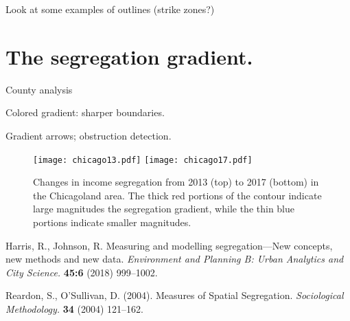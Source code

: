 \documentclass{article}
\theoremstyle{theorem}
\theoremstyle{definition}
\begin{document}
Look at some examples of outlines (strike zones?)

\section{The segregation gradient.}

County analysis

Colored gradient: sharper boundaries.

Gradient arrows; obstruction detection.

\begin{figure}
  \texttt{[image: chicago13.pdf]}
  \texttt{[image: chicago17.pdf]}
  \caption{Changes in income segregation from 2013 (top) to 2017 (bottom) in the Chicagoland area. The thick red portions of the contour indicate large magnitudes the segregation gradient, while the thin blue portions indicate smaller magnitudes.}
  \label{fig:chicago}
\end{figure}



\begin{thebibliography}{1}
Harris, R., Johnson, R. Measuring and modelling segregation---New concepts, new methods and new data. \textit{Environment and Planning B: Urban Analytics and City Science.} \textbf{45:6} (2018) 999--1002.

Reardon, S., O'Sullivan, D. (2004). Measures of Spatial Segregation. \textit{Sociological Methodology.} \textbf{34} (2004) 121--162.

%
\end{thebibliography}
\end{document}
